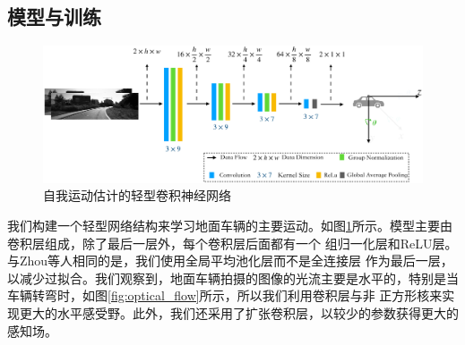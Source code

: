 \subsection{模型与训练}
\label{sec:model}
\begin{figure}[t]
    \centering
    \includegraphics[width=\textwidth]{datavo/network_structure_2-crop.pdf}
    \caption{自我运动估计的轻型卷积神经网络}
    \label{fig:nerwork_structure}
\end{figure}
我们构建一个轻型网络结构来学习地面车辆的主要运动。如图\ref{fig:nerwork_structure}所示。模型主要由卷积层组成，除了最后一层外，每个卷积层后面都有一个
组归一化层\cite{wu2018group}和ReLU层。与Zhou等人相同的是\cite{zhou2017unsupervised}，我们使用全局平均池化层\cite{lin2013network}而不是全连接层
作为最后一层，以减少过拟合。我们观察到，地面车辆拍摄的图像的光流主要是水平的，特别是当车辆转弯时，如图\ref{fig:optical_flow}所示，所以我们利用卷积层与非
正方形核来实现更大的水平感受野。此外，我们还采用了扩张卷积层\cite{yu2015multi}，以较少的参数获得更大的感知场。
